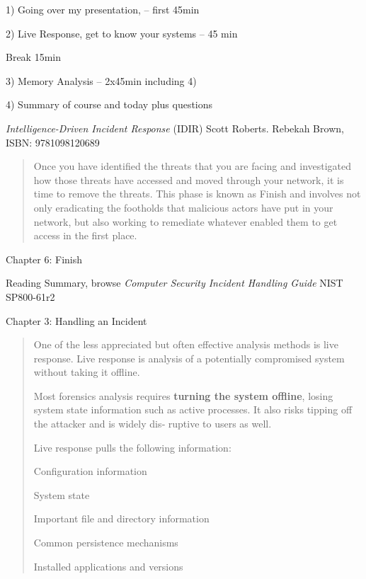 \documentclass[Screen16to9,17pt]{foils}
\begin{document}
\begin{list2}
\item 1) Going over my presentation,  -- first 45min
\item 2) Live Response, get to know your systems -- 45 min
\item Break 15min
\item 3) Memory Analysis -- 2x45min including 4)
\item 4) Summary of course and today plus questions
\end{list2}



\emph{Intelligence-Driven Incident Response} (IDIR)
 Scott Roberts. Rebekah Brown, ISBN: 9781098120689

\begin{quote}
Once you have identified the threats that you are facing and investigated how those
threats have accessed and moved through your network, it is time to remove the
threats. This phase is known as Finish and involves not only eradicating the footholds
that malicious actors have put in your network, but also working to remediate whatever enabled them to get access in the first place.
\end{quote}

\begin{list2}
\item Chapter 6: Finish
\end{list2}

Reading Summary, browse \emph{Computer Security Incident Handling Guide} NIST SP800-61r2
\begin{list2}
\item  Chapter 3: Handling an Incident
\end{list2}




\begin{quote}
One of the less appreciated but often effective analysis methods is live response. Live
response is analysis of a potentially compromised system without taking it offline.

Most forensics analysis requires {\bf turning the system offline}, losing system state information such as active processes. It also risks tipping off the attacker and is widely dis‐
ruptive to users as well.

Live response pulls the following information:
\begin{list2}
\item Configuration information
\item System state
\item Important file and directory information
\item Common persistence mechanisms
\item Installed applications and versions
\end{list2}
\end{quote}
\end{document}

